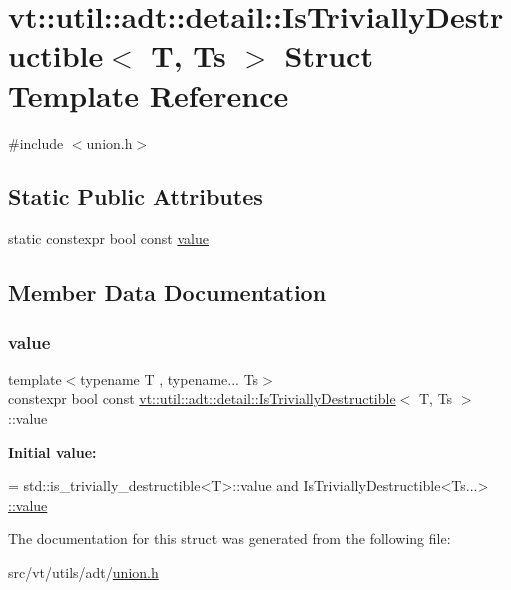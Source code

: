 \hypertarget{structvt_1_1util_1_1adt_1_1detail_1_1_is_trivially_destructible}{}\section{vt\+:\+:util\+:\+:adt\+:\+:detail\+:\+:Is\+Trivially\+Destructible$<$ T, Ts $>$ Struct Template Reference}
\label{structvt_1_1util_1_1adt_1_1detail_1_1_is_trivially_destructible}


{\ttfamily \#include $<$union.\+h$>$}

\subsection*{Static Public Attributes}
\begin{DoxyCompactItemize}
\item 
static constexpr bool const \hyperlink{structvt_1_1util_1_1adt_1_1detail_1_1_is_trivially_destructible_a8c08244bde91f158d601667eab381818}{value}
\end{DoxyCompactItemize}


\subsection{Member Data Documentation}
\mbox{\label{structvt_1_1util_1_1adt_1_1detail_1_1_is_trivially_destructible_a8c08244bde91f158d601667eab381818}} 
\subsubsection{\texorpdfstring{value}{value}}
{\footnotesize\ttfamily template$<$typename T , typename... Ts$>$ \\
constexpr bool const \hyperlink{structvt_1_1util_1_1adt_1_1detail_1_1_is_trivially_destructible}{vt\+::util\+::adt\+::detail\+::\+Is\+Trivially\+Destructible}$<$ T, Ts $>$\+::value\hspace{0.3cm}{\ttfamily [static]}}

{\bfseries Initial value\+:}
\begin{DoxyCode}
=
    std::is\_trivially\_destructible<T>::value and IsTriviallyDestructible<Ts...>
      \hyperlink{structvt_1_1util_1_1adt_1_1detail_1_1_is_trivially_destructible_a8c08244bde91f158d601667eab381818}{::value}
\end{DoxyCode}


The documentation for this struct was generated from the following file\+:\begin{DoxyCompactItemize}
\item 
src/vt/utils/adt/\hyperlink{union_8h}{union.\+h}\end{DoxyCompactItemize}
